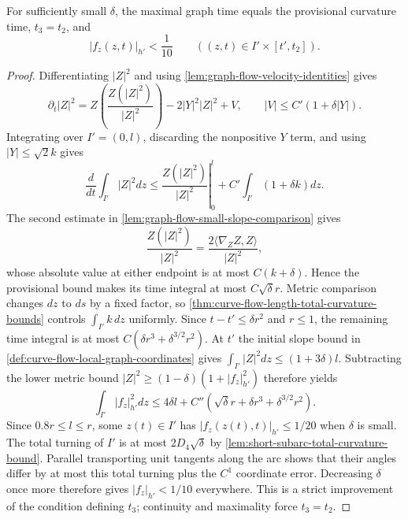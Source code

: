 \begin{theorem}
\label{lem:graph-slope-persistence}
\notready
For sufficiently small $\delta$, the maximal graph time equals the
provisional curvature time, $t_3=t_2$, and
\[
 |f_z(z,t)|_{h'}<\frac1{10}
 \qquad((z,t)\in I'\times[t',t_2]).
\]
\end{theorem}
\begin{proof}
Differentiating $|Z|^2$ and using
\ref{lem:graph-flow-velocity-identities} gives
\[
 \partial_t|Z|^2
 =Z\left(\frac{Z(|Z|^2)}{|Z|^2}\right)-2|Y|^2|Z|^2+V,
 \qquad |V|\le C'(1+\delta|Y|).
\]
Integrating over $I'=(0,l)$, discarding the nonpositive $Y$ term, and using
$|Y|\le\sqrt2k$ gives
\[
 \frac d{dt}\int_{I'}|Z|^2dz
 \le \left.\frac{Z(|Z|^2)}{|Z|^2}\right|_0^l
      +C'\int_{I'}(1+\delta k)dz.
\]
The second estimate in \ref{lem:graph-flow-small-slope-comparison} gives
\[
 \frac{Z(|Z|^2)}{|Z|^2}
 =\frac{2\langle\nabla_ZZ,Z\rangle}{|Z|^2},
\]
whose absolute value at either endpoint is at most $C(k+\delta)$.  Hence the
provisional bound makes its time integral at most
$C\sqrt\delta r$.  Metric comparison changes $dz$ to $ds$ by a fixed factor,
so \ref{thm:curve-flow-length-total-curvature-bounds} controls
$\int_{I'}k\,dz$ uniformly.  Since $t-t'\le\delta r^2$ and $r\le1$, the
remaining time integral is at most $C(\delta r^3+\delta^{3/2}r^2)$.
At $t'$ the initial slope bound in
\ref{def:curve-flow-local-graph-coordinates} gives
$\int_{I'}|Z|^2dz\le(1+3\delta)l$.  Subtracting the lower metric bound
$|Z|^2\ge(1-\delta)(1+|f_z|_{h'}^2)$ therefore yields
\[
 \int_{I'}|f_z|_{h'}^2dz
 \le4\delta l+C''(\sqrt\delta r+\delta r^3+\delta^{3/2}r^2).
\]
Since $0.8r\le l\le r$, some $z(t)\in I'$ has
$|f_z(z(t),t)|_{h'}\le1/20$ when $\delta$ is small.  The total turning of
$I'$ is at most $2D_4\sqrt\delta$ by
\ref{lem:short-subarc-total-curvature-bound}.  Parallel
transporting unit tangents along the arc shows that their angles differ by
at most this total turning plus the $C^1$ coordinate error.  Decreasing
$\delta$ once more therefore gives $|f_z|_{h'}<1/10$ everywhere.  This is a
strict improvement of the condition defining $t_3$; continuity and
maximality force $t_3=t_2$.
\end{proof}

